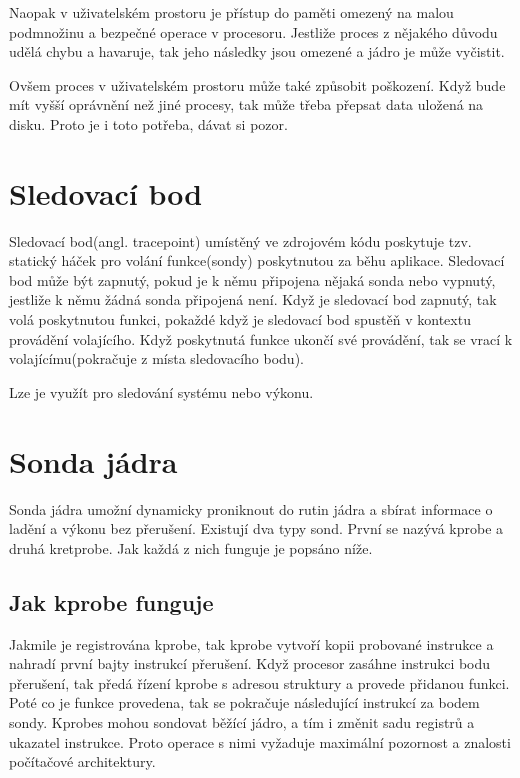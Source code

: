 Naopak v uživatelském prostoru je přístup do paměti omezený na malou podmnožinu a bezpečné operace v procesoru. Jestliže proces z nějakého
důvodu udělá chybu a havaruje, tak jeho následky jsou omezené a jádro je může vyčistit.

Ovšem proces v uživatelském prostoru může také způsobit poškození. Když bude mít vyšší oprávnění než jiné procesy, tak může třeba přepsat
data uložená na disku. Proto je i toto potřeba, dávat si pozor.

\section{Sledovací bod}
\label{sec:SledovaciBod}

Sledovací bod(angl. tracepoint)\cite{Tracepoints} umístěný ve zdrojovém kódu poskytuje tzv. statický háček pro volání funkce(sondy) poskytnutou za běhu aplikace.
Sledovací bod může být zapnutý, pokud je k němu připojena nějaká sonda nebo vypnutý, jestliže k němu žádná sonda připojená není. Když je
sledovací bod zapnutý, tak volá poskytnutou funkci, pokaždé když je sledovací bod spustěň v kontextu provádění volajícího. Když poskytnutá
funkce ukončí své provádění, tak se vrací k volajícímu(pokračuje z místa sledovacího bodu).

Lze je využít pro sledování systému nebo výkonu.

\section{Sonda jádra}

Sonda jádra umožní dynamicky proniknout do rutin jádra a sbírat informace o ladění a výkonu bez přerušení. Existují dva typy sond. První se nazývá kprobe a druhá  kretprobe. Jak každá z nich funguje je popsáno níže.

\subsection*{Jak kprobe funguje}

Jakmile je registrována kprobe, tak kprobe vytvoří kopii probované instrukce a nahradí první bajty instrukcí přerušení. Když procesor zasáhne instrukci bodu přerušení, tak předá řízení kprobe s adresou struktury a provede přidanou funkci. Poté co je funkce provedena, tak se pokračuje následující instrukcí za bodem sondy. Kprobes mohou sondovat běžící jádro, a tím i změnit sadu registrů a ukazatel instrukce. Proto operace s nimi vyžaduje maximální pozornost a znalosti počítačové architektury.

